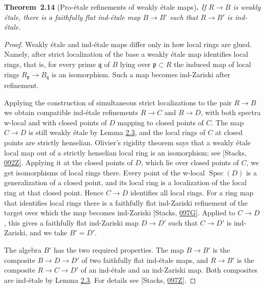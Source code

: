 \documentclass[11pt]{article}
\newenvironment{bpstatement}[2]{\par\addvspace{0.6\baselineskip}\noindent\textbf{#1}#2\textbf{.}\enspace\ignorespaces}
  {\par\addvspace{0.4\baselineskip}}
\newenvironment{bpstatementit}[2]{\begin{bpstatement}{#1}{#2}\itshape\ignorespaces}{\end{bpstatement}}
\begin{document}
\label{bp40}%
\begin{bpstatementit}{Theorem~2.14}{ (Pro-étale refinements of weakly étale maps)}
If \(R\to B\) is weakly étale, there is a faithfully flat ind-étale map \(B\to B'\) such that \(R\to B'\) is ind-étale.
\end{bpstatementit}

\begin{proof}[{Proof}]\label{bp41}%
Weakly étale and ind-étale maps differ only in how local rings are glued. Namely, after strict localization of the base a weakly étale map identifies local rings, that is, for every prime \(\mathfrak q\) of \(B\) lying over \(\mathfrak p\subset R\) the induced map of local rings \(R_{\mathfrak p}\to B_{\mathfrak q}\) is an isomorphism. Such a map becomes ind-Zariski after refinement.

Applying the construction of simultaneous strict localizations to the pair \(R\to B\) we obtain compatible ind-étale refinements \(R\to C\) and \(B\to D\), with both spectra w-local and with closed points of \(D\) mapping to closed points of \(C\). The map \(C\to D\) is still weakly étale by Lemma \hyperref[bp10]{2.3}, and the local rings of \(C\) at closed points are strictly henselian. Olivier's rigidity theorem says that a weakly étale local map out of a strictly henselian local ring is an isomorphism; see [Stacks, \href{https://stacks.math.columbia.edu/tag/092Z}{092Z}]. Applying it at the closed points of \(D\), which lie over closed points of \(C\), we get isomorphisms of local rings there. Every point of the w-local \(\operatorname{Spec}(D)\) is a generalization of a closed point, and its local ring is a localization of the local ring at that closed point. Hence \(C\to D\) identifies all local rings. For a ring map that identifies local rings there is a faithfully flat ind-Zariski refinement of the target over which the map becomes ind-Zariski [Stacks, \href{https://stacks.math.columbia.edu/tag/097G}{097G}]. Applied to \(C\to D\), this gives a faithfully flat ind-Zariski map \(D\to D'\) such that \(C\to D'\) is ind-Zariski, and we take \(B'=D'\).

The algebra \(B'\) has the two required properties. The map \(B\to B'\) is the composite \(B\to D\to D'\) of two faithfully flat ind-étale maps, and \(R\to B'\) is the composite \(R\to C\to D'\) of an ind-étale and an ind-Zariski map. Both composites are ind-étale by Lemma \hyperref[bp10]{2.3}. For details see [Stacks, \href{https://stacks.math.columbia.edu/tag/097Z}{097Z}].
\end{proof}
\end{document}
